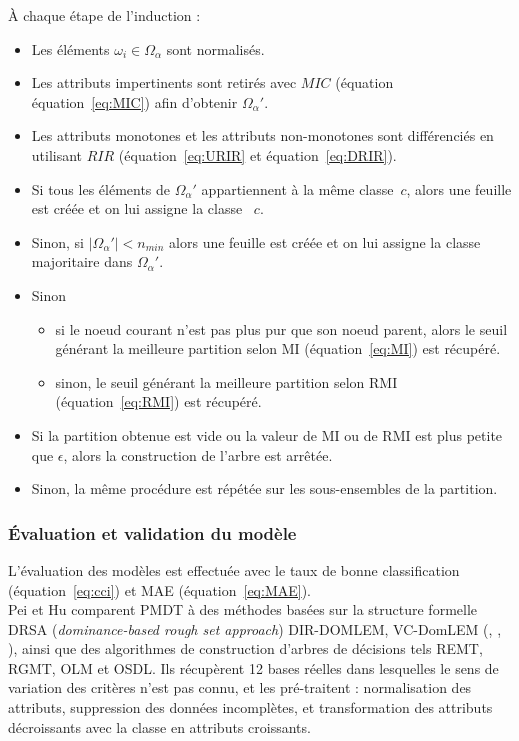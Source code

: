 \documentclass[a4paper]{article}
\renewcommand{\eqref}[1]{équation~\ref{#1}}
\begin{document}
À chaque étape de l'induction :
\begin{itemize}
    \item Les éléments $\omega_i \in \Omega_{\alpha}$ sont normalisés.
    \item Les attributs impertinents sont retirés avec $MIC$ (équation
        \eqref{eq:MIC}) afin d'obtenir $\Omega_{\alpha}'$.
    \item Les attributs monotones et les attributs non-monotones sont
        différenciés en utilisant $RIR$ (\eqref{eq:URIR} et \eqref{eq:DRIR}).
    \item Si tous les éléments de $\Omega_{\alpha}'$ appartiennent à la même classe~$c$,
        alors une feuille est créée et on lui assigne la classe ~$c$.
    \item Sinon, si $|\Omega_{\alpha}'| < n_{min}$ alors une feuille est créée et
        on lui assigne la classe majoritaire dans $\Omega_{\alpha}'$.
    \item Sinon
        \begin{itemize}
            \item si le noeud courant n'est pas plus pur que son noeud parent,
                alors le seuil générant la meilleure partition selon MI
                (\eqref{eq:MI}) est récupéré.
            \item sinon, le seuil générant la meilleure partition selon RMI
                (\eqref{eq:RMI}) est récupéré.
        \end{itemize}
    \item Si la partition obtenue est vide ou la valeur de MI ou de RMI est plus
        petite que $\epsilon$, alors la construction de l'arbre est arrêtée.
    \item Sinon, la même procédure est répétée sur les sous-ensembles de la
        partition. \\
\end{itemize}

\subsubsection{Évaluation et validation du modèle}

L'évaluation des modèles est effectuée avec le taux de bonne classification
(\eqref{eq:cci}) et MAE (\eqref{eq:MAE}).\\

Pei et Hu \cite{pei-partially} comparent PMDT à des méthodes basées sur la
structure formelle DRSA (\emph{dominance-based rough set approach}) DIR-DOMLEM,
VC-DomLEM (\cite{blaszczynski-sequential}, \cite{blaszczynski-induction},
\cite{wang-induction}), ainsi que des algorithmes de construction d'arbres de
décisions tels REMT, RGMT, OLM et OSDL. Ils récupèrent 12 bases réelles dans
lesquelles le sens de variation des critères n'est pas connu, et les
pré-traitent : normalisation des attributs, suppression des données incomplètes,
et transformation des attributs décroissants avec la classe en attributs
croissants.
\end{document}
